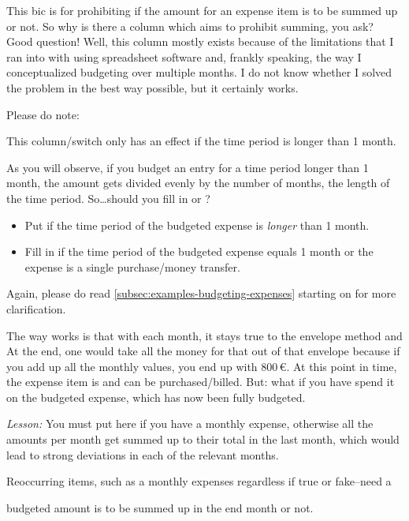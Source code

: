 This \ac{bic} is for prohibiting if the amount for an expense item is to be summed up or not.
So why is there a column which aims to prohibit summing, you ask?
Good question!
Well, this column mostly exists because of the limitations that I ran into with using spreadsheet software and, frankly speaking, the way I conceptualized budgeting over multiple months.
I do not know whether I solved the problem in the best way possible, but it certainly works.

Please do note:
\begin{specialnote}
	This column/switch only has an effect if the time period is longer than 1 month.
\end{specialnote}

As you will observe, if you budget an entry for a time period longer than 1 month, the amount gets divided evenly by the number of months, \ie the length of the time period.
So\ldots should you fill in  or ?
\begin{itemize}
	\item Put  if the time period of the budgeted expense is \emph{longer} than 1 month.
	\item Fill in  if the time period of the budgeted expense equals 1 month or the expense is a single purchase/money transfer.
\end{itemize}
Again, please do read \autoref{subsec:examples-budgeting-expenses} starting on  for more clarification.




The way \tfn works is that with each month, it stays true to the envelope method and 
At the end, one would take all the money for that out of that envelope because if you add up all the monthly values, you end up with 800\,€.
At this point in time, the expense item is  and can be purchased/billed.
But: what if you have 
spend it on the budgeted expense, which has now been fully budgeted.

\emph{Lesson:} You must put  here if you have a monthly expense, otherwise all the amounts per month get summed up to their total in the last month, which would lead to strong deviations in each of the relevant months.

Reoccurring items, such as a monthly expenses regardless if true or fake--need a 

		budgeted amount is to be summed up in the end month or not.

